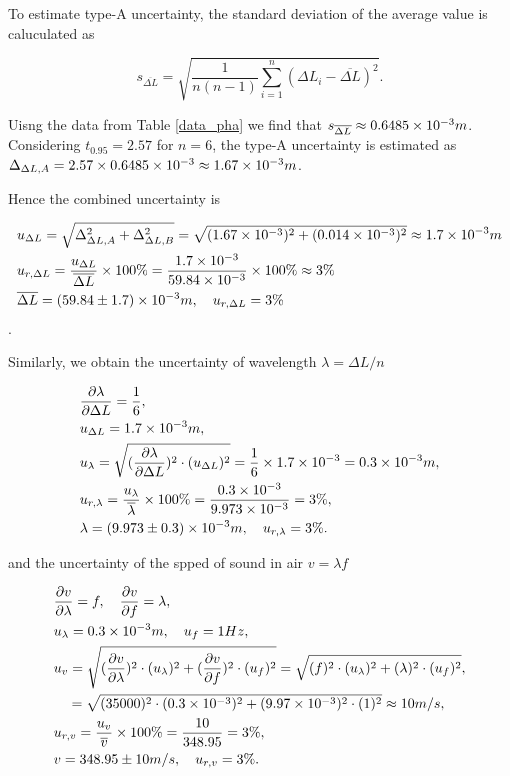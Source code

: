     To estimate type-A uncertainty, the standard deviation of the average value is caluculated as

    \[
        s_{\overline{\Delta L}}=\sqrt{\frac{1}{n(n-1)}\sum_{i=1}^n(\Delta
          L_i-\overline{\Delta L})^2}. 
    \]

    Uisng the data from Table \ref{data_pha} we find that $s_{\overline{\Delta
        L}}\approx 0.6485\times 10^{-3}m$. Considering $t_{0.95}=2.57$ for $n=6$, the
    type-A uncertainty is estimated as $\Delta_{\Delta
      L,A}=2.57\times0.6485\times 10^{-3}\approx 1.67\times 10^{-3}m$. 

    Hence the combined uncertainty is 

    \[
    \begin{split}
        &u_{\Delta L}=\sqrt{\Delta_{\Delta L,A}^2+\Delta_{\Delta
            L,B}^2}=\sqrt{(1.67\times 10^{-3})^2+(0.014\times 10^{-3})^2}\approx1.7\times 10^{-3}m\\ 
        &u_{r,\Delta L}=\frac{u_{\Delta L}}{\overline{\Delta L}}\times
        100\%=\frac{1.7\times 10^{-3}}{59.84\times 10^{-3}}\times100\%\approx3\%\\ 
        &\overline{\Delta L}=(59.84\pm 1.7)\times 10^{-3}m,\quad u_{r,\Delta L}=3\% 
    \end{split}
    \].

    Similarly, we obtain the uncertainty of wavelength $\lambda=\Delta L/n$

    \[
    \begin{split}
        &\frac{\partial \lambda}{\partial \Delta L}=\frac{1}{6},\\ 
        &u_{\Delta L}=1.7\times 10^{-3}m,\\
        &u_{\lambda}=\sqrt{(\frac{\partial \lambda}{\partial \Delta L})^2\cdot
          (u_{\Delta L})^2}=\frac{1}{6}\times 1.7\times 10^{-3}=0.3\times 10^{-3}m,\\ 
        &u_{r,\lambda}=\frac{u_{\lambda}}{\overline{\lambda}}\times
        100\%=\frac{0.3\times 10^{-3}}{9.973\times 10^{-3}}=3\%,\\ 
        &\lambda=(9.973\pm0.3)\times 10^{-3}m,\quad u_{r,\lambda}=3\%. 
    \end{split}
    \]

    and the uncertainty of the spped of sound in air $v=\lambda f$

    \[
    \begin{split}
        &\frac{\partial v}{\partial \lambda}=f,\quad \frac{\partial v}{\partial 
          f}=\lambda,\\ 
        &u_{\lambda}=0.3\times 10^{-3}m,\quad u_{f}=1Hz,\\
        &u_{v}=\sqrt{(\frac{\partial v}{\partial \lambda})^2\cdot
          (u_{\lambda})^2+(\frac{\partial v}{\partial f})^2\cdot
          (u_{f})^2}=\sqrt{(f)^2\cdot (u_{\lambda})^2+(\lambda)^2\cdot
          (u_{f})^2},\\ 
        &\quad =\sqrt{(35000)^2\cdot(0.3\times 10^{-3})^2+(9.97\times 10^{-3})^2\cdot(1)^2}
        \approx10m/s,\\
        &u_{r,v}=\frac{u_v}{\overline{v}}\times 100\%=\frac{10}{348.95}=3\%,\\
        &v=348.95\pm10 m/s,\quad u_{r,v}=3\%.
    \end{split}
    \]


